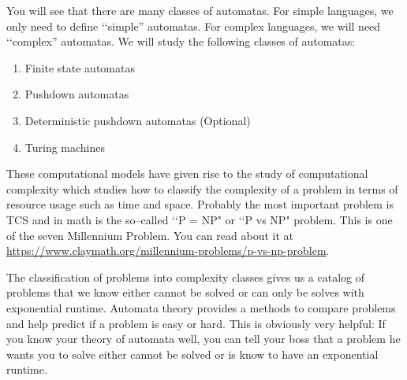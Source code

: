 You will see that there are many classes of automatas.
For simple languages, we only need to define \lq\lq simple'' automatas.
For complex languages, we will need \lq\lq complex'' automatas.
We will study the following classes of automatas:
\begin{enumerate}
\item Finite state automatas 
\item Pushdown automatas
\item Deterministic pushdown automatas (Optional)
\item Turing machines
\end{enumerate}

These computational models have given rise to
the study of computational complexity 
which studies how to classify the complexity of a problem
in terms of resource usage such as time and space.
Probably the most important problem is TCS and in math
is the so--called \lq\lq P = NP" or \lq\lq P vs NP" problem.
This is one of the seven Millennium Problem.
You can read about it at
\url{https://www.claymath.org/millennium-problems/p-vs-np-problem}.

The classification of problems into complexity classes
gives us a catalog of problems that we know either cannot be solved
or can only be solves with exponential runtime.
Automata theory provides a methods to compare problems and
help predict if a problem is easy or hard.
This is obviously very helpful:
If you know your theory of automata well, you can tell your boss
that a problem he wants you to solve either cannot be solved or
is know to have an exponential runtime.

